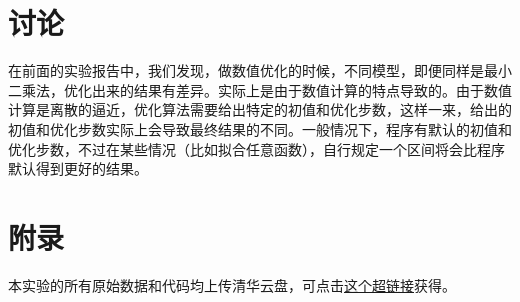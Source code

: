 \documentclass[fleqn,10pt]{SelfArx} %
\begin{document}

\section{讨论}

在前面的实验报告中，我们发现，做数值优化的时候，不同模型，即便同样是最小二乘法，优化出来的结果有差异。实际上是由于数值计算的特点导致的。由于数值计算是离散的逼近，优化算法需要给出特定的初值和优化步数，这样一来，给出的初值和优化步数实际上会导致最终结果的不同。一般情况下，程序有默认的初值和优化步数，不过在某些情况（比如拟合任意函数），自行规定一个区间将会比程序默认得到更好的结果。


\appendix
\section{附录}
\renewcommand{\thetable}{附表\arabic{table}}
\setcounter{table}{0}

本实验的所有原始数据和代码均上传清华云盘，可点击\href{https://cloud.tsinghua.edu.cn/d/c8e259e22c4d4d68b8cf/}{这个超链接}获得。
\end{document}
